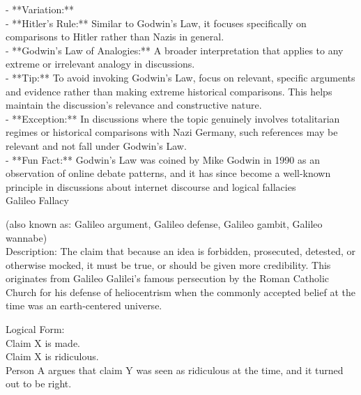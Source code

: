 \documentclass[a4paper,12pt,single,pdftex]{scrbook}
\begin{document}
    
      - **Variation:**
    \\

    
        - **Hitler's Rule:** Similar to Godwin's Law, it focuses specifically on comparisons to Hitler rather than Nazis in general.
    \\

    
        - **Godwin’s Law of Analogies:** A broader interpretation that applies to any extreme or irrelevant analogy in discussions.
    \\

    
      - **Tip:** To avoid invoking Godwin's Law, focus on relevant, specific arguments and evidence rather than making extreme historical comparisons. This helps maintain the discussion's relevance and constructive nature.
    \\

    
      - **Exception:** In discussions where the topic genuinely involves totalitarian regimes or historical comparisons with Nazi Germany, such references may be relevant and not fall under Godwin's Law.
    \\

    
      - **Fun Fact:** Godwin's Law was coined by Mike Godwin in 1990 as an observation of online debate patterns, and it has since become a well-known principle in discussions about internet discourse and logical fallacies
    \\

  

Galileo Fallacy
    
      (also known as: Galileo argument, Galileo defense, Galileo gambit, Galileo wannabe)
    \\

  
    Description: The claim that because an idea is forbidden, prosecuted, detested, or otherwise mocked, it must be true, or should be given more credibility. This originates from Galileo Galilei's famous persecution by the Roman Catholic Church for his defense of heliocentrism when the commonly accepted belief at the time was an earth-centered universe.

    
      Logical Form:
    \\

    
      Claim X is made.
    \\

    
      Claim X is ridiculous.
    \\

    
      Person A argues that claim Y was seen as ridiculous at the time, and it turned out to be right.
    \\
\end{document}
